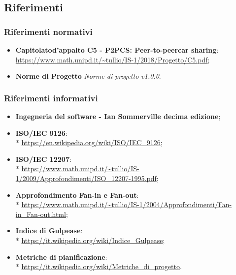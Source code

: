 \subsection{Riferimenti}
\subsubsection{Riferimenti normativi}
\begin{itemize}

\item \textbf{Capitolato\glosp d'appalto C5 - P2PCS: Peer-to-peer\glosp car sharing}: \\ \url{https://www.math.unipd.it/~tullio/IS-1/2018/Progetto/C5.pdf};
\item \textbf{Norme di Progetto} \textit{Norme di progetto v1.0.0}.
\end{itemize}
\subsubsection{Riferimenti informativi}
\begin{itemize}
\item \textbf{Ingegneria del software - Ian Sommerville decima edizione};
\item \textbf{ISO/IEC 9126}: \\* \url{https://en.wikipedia.org/wiki/ISO/IEC_9126};
\item \textbf{ISO/IEC 12207}: \\* 
\url{https://www.math.unipd.it/~tullio/IS-1/2009/Approfondimenti/ISO\_12207-1995.pdf};
\item \textbf{Approfondimento Fan-in e Fan-out}: \\*
\url{https://www.math.unipd.it/~tullio/IS-1/2004/Approfondimenti/Fan-in_Fan-out.html};
\item \textbf{Indice di Gulpease}: \\* \url{https://it.wikipedia.org/wiki/Indice_Gulpease};
\item \textbf{Metriche di pianificazione}: \\* \url{https://it.wikipedia.org/wiki/Metriche_di_progetto}.
\end{itemize}